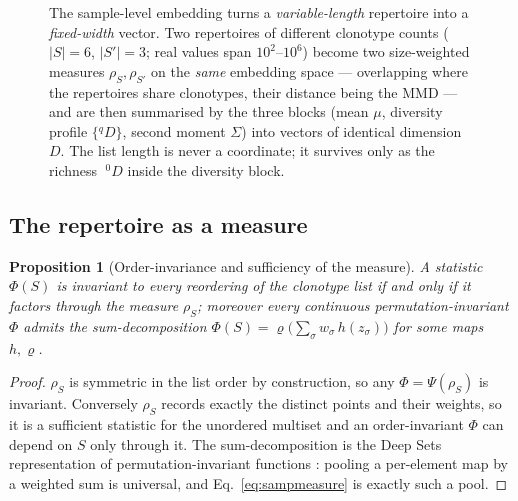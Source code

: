 \documentclass[11pt]{article}
\theoremstyle{oldplain}
\newtheorem{proposition}{Proposition}
\theoremstyle{oldrem}
\newcommand{\R}{\mathds{R}}  %
\begin{document}
\begin{figure}[t]
\caption{The sample-level embedding turns a \emph{variable-length} repertoire into a \emph{fixed-width}
vector. Two repertoires of different clonotype counts ($|S|{=}6$, $|S'|{=}3$; real values span
$10^2$--$10^6$) become two size-weighted measures $\rho_S,\rho_{S'}$ on the \emph{same} embedding space ---
overlapping where the repertoires share clonotypes, their distance being the {\scshape MMD} --- and are then
summarised by the three blocks (mean $\mu$, diversity profile $\{{}^qD\}$, second moment $\Sigma$) into vectors
of identical dimension $D$. The list length is never a coordinate; it survives only as the richness
$\;^0D$ inside the diversity block.}
\label{fig:samppipe}
\end{figure}

\subsection{The repertoire as a measure}\label{sec:samp-measure}

\begin{proposition}[Order-invariance and sufficiency of the measure]\label{prop:sampinv}
A statistic $\Phi(S)$ is invariant to every reordering of the clonotype list if and only if it factors through
the measure $\rho_S$; moreover every continuous permutation-invariant $\Phi$ admits the sum-decomposition
$\Phi(S)=\varrho\!\big(\sum_\sigma w_\sigma\,h(z_\sigma)\big)$ for some maps $h,\varrho$.
\end{proposition}
\begin{proof}
$\rho_S$ is symmetric in the list order by construction, so any $\Phi=\Psi(\rho_S)$ is invariant. Conversely
$\rho_S$ records exactly the distinct points and their weights, so it is a sufficient statistic for the unordered
multiset and an order-invariant $\Phi$ can depend on $S$ only through it. The sum-decomposition is the Deep Sets
representation of permutation-invariant functions \cite{Zaheer2017}: pooling a per-element map by a weighted sum
is universal, and Eq.~\eqref{eq:sampmeasure} is exactly such a pool. \end{proof}
\end{document}
